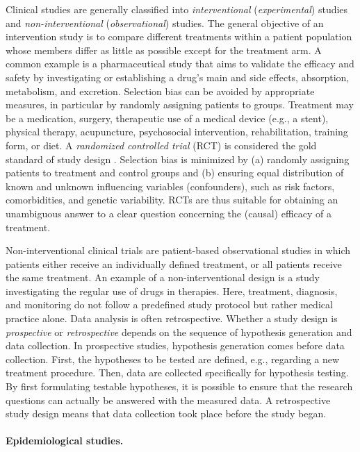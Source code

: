 \documentclass[
  oneside]{book}
\begin{document}
Clinical studies are generally classified into \emph{interventional} (\emph{experimental}) studies and \emph{non-interventional} (\emph{observational}) studies.
The general objective of an intervention study is to compare different treatments within a patient population whose members differ as little as possible except for the treatment arm.
A common example is a pharmaceutical study that aims to validate the efficacy and safety by investigating or establishing a drug's main and side effects, absorption, metabolism, and excretion.
Selection bias can be avoided by appropriate measures, in particular by randomly assigning patients to groups.
Treatment may be a medication, surgery, therapeutic use of a medical device (e.g., a stent), physical therapy, acupuncture, psychosocial intervention, rehabilitation, training form, or diet.
A \emph{randomized controlled trial} (RCT) is considered the gold standard of study design \autocite{hariton2018}.
Selection bias is minimized by (a) randomly assigning patients to treatment and control groups and (b) ensuring equal distribution of known and unknown influencing variables (confounders), such as risk factors, comorbidities, and genetic variability.
RCTs are thus suitable for obtaining an unambiguous answer to a clear question concerning the (causal) efficacy of a treatment.

Non-interventional clinical trials are patient-based observational studies in which patients either receive an individually defined treatment, or all patients receive the same treatment.
An example of a non-interventional design is a study investigating the regular use of drugs in therapies.
Here, treatment, diagnosis, and monitoring do not follow a predefined study protocol but rather medical practice alone.
Data analysis is often retrospective.
Whether a study design is \emph{prospective} or \emph{retrospective} depends on the sequence of hypothesis generation and data collection.
In prospective studies, hypothesis generation comes before data collection.
First, the hypotheses to be tested are defined, e.g., regarding a new treatment procedure.
Then, data are collected specifically for hypothesis testing.
By first formulating testable hypotheses, it is possible to ensure that the research questions can actually be answered with the measured data.
A retrospective study design means that data collection took place before the study began.

\paragraph*{Epidemiological studies.}
\end{document}
